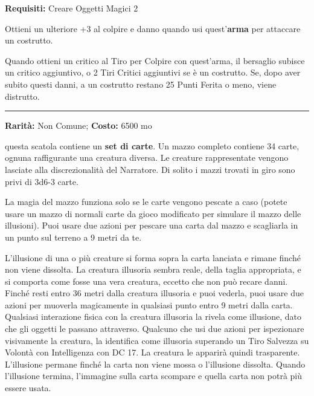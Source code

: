 \begin{multicols}{2}
\textbf{Requisiti:} Creare Oggetti Magici 2

Ottieni un ulteriore +3 al colpire e danno quando usi quest'\textbf{arma} per attaccare un costrutto.

Quando ottieni un critico al Tiro per Colpire con quest'arma, il bersaglio subisce un critico aggiuntivo, o 2 Tiri Critici aggiuntivi se è un costrutto. Se, dopo aver subito questi danni, a un costrutto restano 25 Punti Ferita o meno, viene distrutto.

\smallskip\noindent\rule{\linewidth}{2pt}  \hypertarget{MazzodelleIllusioni}{}\smallskip{}\noindent\label{MazzodelleIllusioni}

\textbf{Rarità:} Non Comune; \textbf{Costo:} 6500 mo

questa scatola contiene un \textbf{set di carte}. Un mazzo completo contiene 34 carte, ognuna raffigurante una creatura diversa. Le creature rappresentate vengono lasciate alla discrezionalità del Narratore. Di solito i mazzi trovati in giro sono privi di 3d6-3 carte.

La magia del mazzo funziona solo se le carte vengono pescate a caso (potete usare un mazzo di normali carte da gioco modificato per simulare il mazzo delle illusioni). Puoi usare due azioni per pescare una carta dal mazzo e scagliarla in un punto sul terreno a 9 metri da te.

L'illusione di una o più creature si forma sopra la carta lanciata e rimane finché non viene dissolta. La creatura illusoria sembra reale, della taglia appropriata, e si comporta come fosse una vera creatura, eccetto che non può recare danni. Finché resti entro 36 metri dalla creatura illusoria e puoi vederla, puoi usare due azioni per muoverla magicamente in qualsiasi punto entro 9 metri dalla carta. Qualsiasi interazione fisica con la creatura illusoria la rivela come illusione, dato che gli oggetti le passano attraverso. Qualcuno che usi due azioni per ispezionare visivamente la creatura, la identifica come illusoria superando un Tiro Salvezza su Volontà con Intelligenza con DC 17. La creatura le apparirà quindi trasparente.
L'illusione permane finché la carta non viene mossa o l'illusione dissolta. Quando l'illusione termina, l'immagine sulla carta scompare e quella carta non potrà più essere usata.

\medskip


\end{multicols}
